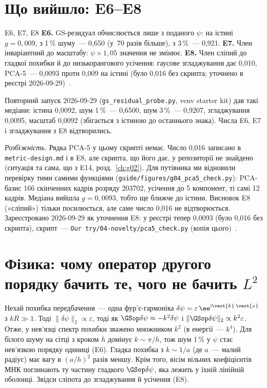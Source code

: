 \section{Що вийшло: E6--E8}\label{sec:g04-results}

\begin{established}{E6, E7, E8}
\textbf{E6.} GS-резидуал обчислюється лише з поданого $\psi$: на істині $g=0{,}009$, з 1\,\% шуму~--- 0,650 (у~70 разів більше), з 3\,\%~--- 0,921.
\textbf{E7.} Член інваріантний до масштабу: $\psi\times1{,}05$ значення не змінює.
\textbf{E8.} Член сліпий до гладкої похибки й до низькорангового усічення: гаусове згладжування дає 0,010, PCA-5~--- 0,0093 проти 0,009 на істині (було 0,016 без скрипта; уточнено в реєстрі 2026-09-29)~\cite{RegEst}.
\end{established}

Повторний запуск 2026-09-29 (\texttt{gs\_residual\_probe.py}, venv starter kit) дав такі медіани: істина 0,0092, шум 1\,\%~--- 0,6500, шум 3\,\%~--- 0,9207, згладжування 0,0095, масштаб 0,0092 (збігається з істиною до останнього знака). Числа E6, E7 і згладжування з E8 відтворились.

\emph{Розбіжність.} Рядка PCA-5 у цьому скрипті немає. Число 0,016 записано в \texttt{metric-\allowbreak design.md} і в E8, але скрипта, що його дає, у репозиторії не знайдено (ситуація та сама, що з E14, розд.~\ref{ch:g02}). Для путівника ми відновили перевірку тими самими функціями (\texttt{guide/\allowbreak figures/\allowbreak g04\_pca5\_check.py}): PCA-базис 166 скінченних кадрів розряду 203702, усічення до 5 компонент, ті самі 12 кадрів. Медіана вийшла $g=0{,}0093$, тобто ще ближче до істини. Висновок E8 («сліпий») тільки посилюється, але саме число 0,016 не відтворюється. Зареєстровано 2026-09-29 як уточнення E8: у реєстрі тепер 0,0093 (було 0,016 без скрипта), скрипт~--- \texttt{Our try/04-novelty/pca5\_check.py} (копія цього)~\cite{RegEst,RegLog}.

\section{Фізика: чому оператор другого порядку бачить те, чого не бачить \texorpdfstring{$L^2$}{L2}}\label{sec:g04-physics}

\begin{derivation}
Нехай похибка передбачення~--- одна фур'є-гармоніка $\delta\psi=\varepsilon\,\ee^{\mathrm{i}\vect{k}\cdot\vect{x}}$ з $kR\gg1$. Тоді $\|\delta\psi\|_2\propto\varepsilon$, тоді як $\GSop\delta\psi\approx-k^2\delta\psi$ і $\|\GSop\delta\psi\|_2\propto k^2\varepsilon$. Отже, у нев'язці спектр похибки зважено множником $k^2$ (в енергії~--- $k^4$). Для білого шуму на сітці з кроком $h$ домінує $k\sim\pi/h$, тож шум 1\,\% у $\psi$ стає нев'язкою порядку одиниці (E6). Гладка похибка з $k\sim1/a$ (де $a$~--- малий радіус) має вагу в $(a/h)^2$ разів меншу. Крім того, вісім вільних коефіцієнтів МНК поглинають ту частину гладкого $\GSop\delta\psi$, яка лежить у їхній лінійній оболонці. Звідси сліпота до згладжування й усічення (E8).
\end{derivation}

